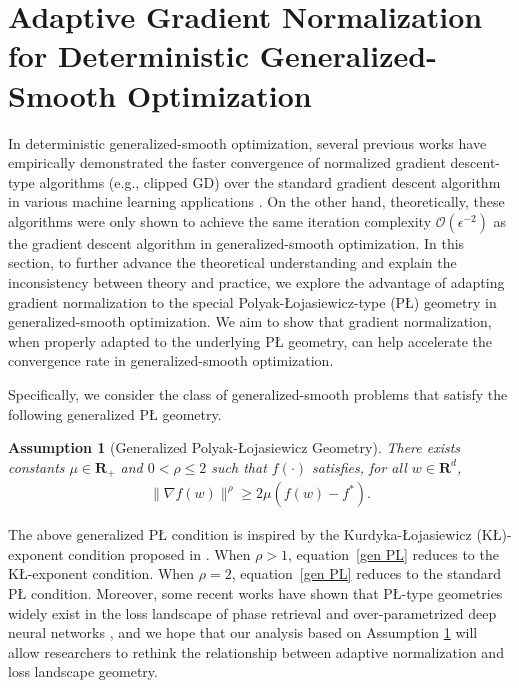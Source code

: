 \documentclass[10pt]{article} %
\def\eqref#1{equation~\ref{#1}}
\newtheorem{assumption}{Assumption}
\begin{document}
\section{Adaptive Gradient Normalization for Deterministic Generalized-Smooth Optimization}
In deterministic generalized-smooth optimization, several previous works have empirically demonstrated the faster convergence of normalized gradient descent-type algorithms (e.g., clipped GD) over the standard gradient descent algorithm in various machine learning applications \citep{zhang2020gradientclippingacceleratestraining,pmlr-v202-chen23ar}. On the other hand, theoretically, these algorithms were only shown to achieve the same iteration complexity $\mathcal{O}(\epsilon^{-2})$ as the gradient descent algorithm in generalized-smooth optimization.
In this section, to further advance the theoretical understanding and explain the inconsistency between theory and practice, we explore the advantage of adapting gradient normalization to the special Polyak-{\L}ojasiewicz-type (P{\L}) geometry in generalized-smooth optimization. We aim to show that gradient normalization, when properly adapted to the underlying P{\L} geometry, can help accelerate the convergence rate in generalized-smooth optimization.

Specifically, we consider the class of generalized-smooth problems that satisfy the following generalized P{\L} geometry.
\begin{assumption}[Generalized Polyak-{\L}ojasiewicz Geometry]\label{assum2}
       There exists constants $\mu\in \mathbf{R}_+$ and $0<\rho\leq 2$ such that $f(\cdot)$ satisfies, for all $w\in \mathbf{R}^d$,
    \begin{align}
        \big \|\nabla f(w) \big \|^{\rho} \geq 2\mu( f(w)-f^*).
        \label{gen PL}
    \end{align} 
\end{assumption}
The above generalized P{\L} condition is inspired by the Kurdyka-{\L}ojasiewicz (K\L)-exponent condition proposed in \citet{KLexponent}. When $\rho > 1$, \eqref{gen PL} reduces to the K\L-exponent condition. When $\rho=2$, \eqref{gen PL} reduces to the standard P{\L} condition. Moreover, some recent works have shown that P{\L}-type geometries widely exist in the loss landscape of phase retrieval \citep{PhaseretrievalPL} and over-parametrized deep neural networks \citep{genPL1,genPL2}, and we hope that our analysis based on Assumption \ref{assum2} will allow researchers to rethink the relationship between adaptive normalization and loss landscape geometry.
\end{document}

